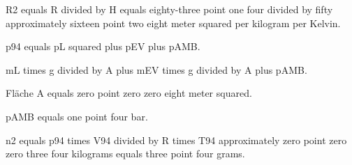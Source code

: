 R2 equals R divided by H equals eighty-three point one four divided by fifty approximately sixteen point two eight meter squared per kilogram per Kelvin.

p94 equals pL squared plus pEV plus pAMB.

mL times g divided by A plus mEV times g divided by A plus pAMB.

Fläche A equals zero point zero zero eight meter squared.

pAMB equals one point four bar.

n2 equals p94 times V94 divided by R times T94 approximately zero point zero zero three four kilograms equals three point four grams.